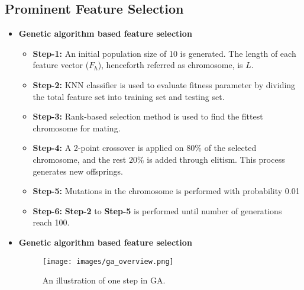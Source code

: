 \subsection{Prominent Feature Selection}
\begin{frame}[t]{\subsecname}
	\topline
    \begin{itemize}
    	\item \textcolor{navy_theme}{\textbf{Genetic algorithm based feature selection}}
    	\vspace{0.5em}
    	\begin{itemize}
			\setlength\itemsep{0.5em}
			\item \textbf{Step-1:} An initial population size of 10 is generated. The
	      length of each feature vector ($F_{h}$), henceforth referred as chromosome, is $L$.
        	\item \textbf{Step-2:} KNN classifier is used to
        	      evaluate fitness parameter by dividing the total feature set into training set and testing set.
        	\item \textbf{Step-3:} Rank-based selection method is used to find the fittest chromosome for mating.
        	\item \textbf{Step-4:} A 2-point crossover is applied on $80 \% $ of the
        	      selected chromosome, and the rest  $20 \%$  is added through elitism. 
        	      This process generates new offsprings.
        	\item \textbf{Step-5:} Mutations in the chromosome is performed with probability 0.01
        	\item \textbf{Step-6:} \textbf{Step-2} to \textbf{Step-5} is performed until number of generations reach 100.
		\end{itemize}
	\end{itemize}
\end{frame}

\begin{frame}[t]{\subsecname}
	\topline
    \begin{itemize}
    	\item \textcolor{navy_theme}{\textbf{Genetic algorithm based feature selection}}
    	\vspace{0.5em}
\begin{figure}[!ht]
			\centering
			\texttt{[image: images/ga\_overview.png]}
			\caption{An illustration of one step in GA.}
			\label{fig:GA}
			\vspace{-4mm}
		\end{figure}
	\end{itemize}
\end{frame}


